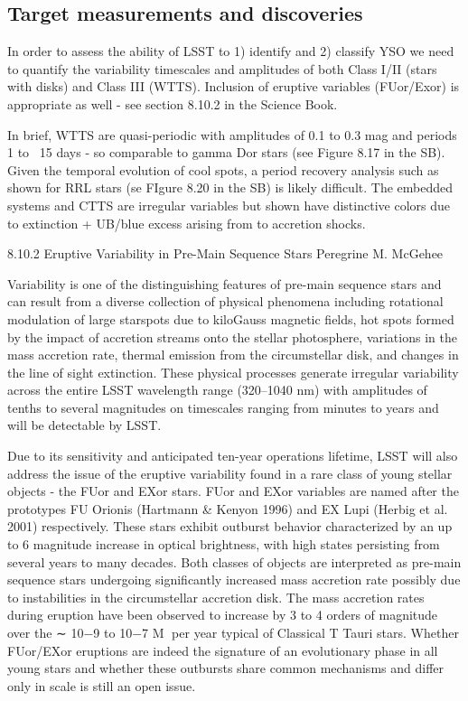 
\subsection{Target measurements and discoveries}
\label{sec:\secname:targets}

In order to assess the ability of LSST to 1) identify and 2) classify
YSO we need to quantify the variability timescales and amplitudes of
both Class I/II (stars with disks) and Class III (WTTS). Inclusion of
eruptive variables (FUor/Exor) is appropriate as well - see section
8.10.2 in the Science Book.

In brief, WTTS are quasi-periodic with amplitudes of 0.1 to 0.3 mag
and periods 1 to ~15 days - so comparable to gamma Dor stars (see
Figure 8.17 in the SB). Given the temporal evolution of cool spots, a
period recovery analysis such as shown for RRL stars (se FIgure 8.20
in the SB) is likely difficult. The embedded systems and CTTS are
irregular variables but shown have distinctive colors due to
extinction + UB/blue excess arising from to accretion shocks.

8.10.2 Eruptive Variability in Pre-Main Sequence Stars
Peregrine M. McGehee

Variability is one of the distinguishing features of pre-main sequence stars and can result from a
diverse collection of physical phenomena including rotational modulation of large starspots due to
kiloGauss magnetic fields, hot spots formed by the impact of accretion streams onto the stellar
photosphere, variations in the mass accretion rate, thermal emission from the circumstellar disk,
and changes in the line of sight extinction. These physical processes generate irregular variability
across the entire LSST wavelength range (320–1040 nm) with amplitudes of tenths to several
magnitudes on timescales ranging from minutes to years and will be detectable by LSST.

Due to its sensitivity and anticipated ten-year operations lifetime, LSST will also address the issue
of the eruptive variability found in a rare class of young stellar objects - the FUor and EXor stars.
FUor and EXor variables are named after the prototypes FU Orionis (Hartmann & Kenyon 1996)
and EX Lupi (Herbig et al. 2001) respectively. These stars exhibit outburst behavior characterized
by an up to 6 magnitude increase in optical brightness, with high states persisting from several years
to many decades. Both classes of objects are interpreted as pre-main sequence stars undergoing
significantly increased mass accretion rate possibly due to instabilities in the circumstellar accretion
disk. The mass accretion rates during eruption have been observed to increase by 3 to 4 orders
of magnitude over the ∼ 10−9
to 10−7 M per year typical of Classical T Tauri stars. Whether
FUor/EXor eruptions are indeed the signature of an evolutionary phase in all young stars and
whether these outbursts share common mechanisms and differ only in scale is still an open issue.

